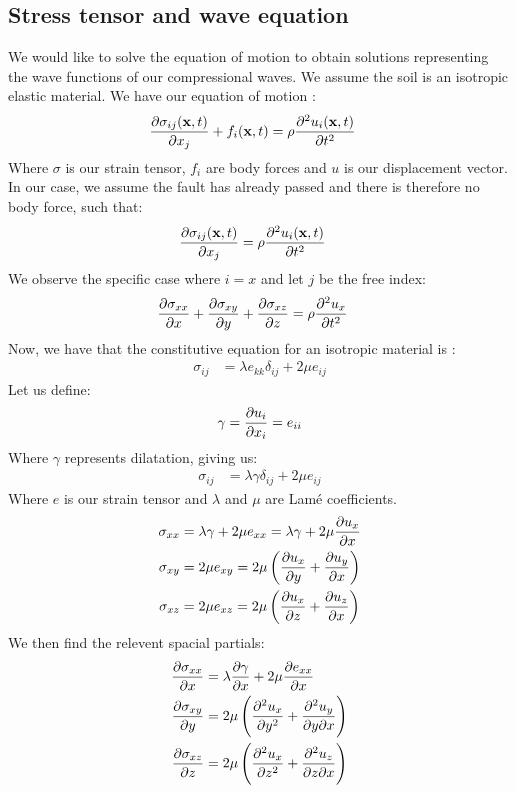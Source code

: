 \subsection{Stress tensor and wave equation}
We would like to solve the equation of motion to obtain solutions representing the wave functions of our compressional waves. We assume the soil is an isotropic elastic material. We have our equation of motion \cite[47]{stein2009introduction}:
\begin{align}
    \frac{\partial \sigma_{ij}(\vb{x},t)}{\partial x_j}+f_i(\vb{x},t) &= \rho\frac{\partial ^2 u_i(\vb{x},t)}{\partial t^2}
\end{align}
Where $\sigma$ is our strain tensor, $f_i$ are body forces and $u$ is our displacement vector. In our case, we assume the fault has already passed and there is therefore no body force, such that:
\begin{align}
    \label{eqn:motion}
    \frac{\partial \sigma_{ij}(\vb{x},t)}{\partial x_j} &= \rho\frac{\partial ^2 u_i(\vb{x},t)}{\partial t^2}   
\end{align}
We observe the specific case where $i=x$ and let $j$ be the free index:
\begin{align}
    \label{eqn:iex}
    \frac{\partial \sigma_{xx}}{\partial x}+\frac{\partial \sigma_{xy}}{\partial y}+\frac{\partial \sigma_{xz}}{\partial z} &= \rho \frac{\partial ^2 u_x}{\partial t^2}
\end{align}
Now, we have that the constitutive equation for an isotropic material is \cite[50]{stein2009introduction}:
\begin{align}
    \sigma_{ij} &= \lambda e_{kk} \delta_{ij} +2\mu e_{ij}
\end{align}
Let us define:
\begin{align*}
    \gamma = \frac{\partial u_i}{\partial x_i} = e_{ii}
\end{align*}
Where $\gamma$ represents dilatation, giving us:
\begin{align}
    \sigma_{ij} &= \lambda \gamma \delta_{ij} +2\mu e_{ij}
\end{align}
Where $e$ is our strain tensor and $\lambda$ and $\mu$ are Lamé coefficients.
\begin{align*}
    \sigma_{xx} &= \lambda \gamma+2\mu e_{xx} = \lambda \gamma+2\mu \frac{\partial u_x}{\partial x}\\
    \sigma_{xy} &= 2\mu e_{xy} = 2\mu\left(\frac{\partial u_x}{\partial y}+\frac{\partial u_y}{\partial x}\right)\\
    \sigma_{xz} &= 2\mu e_{xz} = 2\mu\left(\frac{\partial u_x}{\partial z}+\frac{\partial u_z}{\partial x}\right)
\end{align*}
We then find the relevent spacial partials:
\begin{align*}
    \frac{\partial \sigma_{xx}}{\partial x} &= \lambda\frac{\partial \gamma}{\partial x}+2\mu\frac{\partial e_{xx}}{\partial x}\\
    \frac{\partial \sigma_{xy}}{\partial y} &= 2\mu\left(\frac{\partial ^2u_x}{\partial y^2}+\frac{\partial ^2u_y}{\partial y\partial x}\right)\\
    \frac{\partial \sigma_{xz}}{\partial z} &= 2\mu\left(\frac{\partial ^2u_x}{\partial z^2}+\frac{\partial ^2u_z}{\partial z\partial x}\right)
\end{align*}
